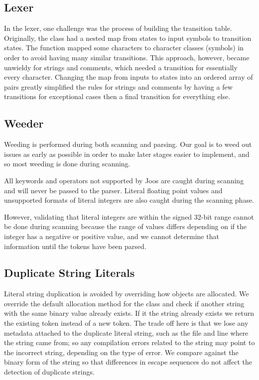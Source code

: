 \documentclass[pdftex,11pt,a4paper]{article}
\begin{document}
\subsection{Lexer}

In the lexer, one challenge was the process of building the transition
table. Originally, the  class had a nested map from states
to input symbols to transition states. The  function
mapped some characters to character classes (symbols) in order to avoid
having many similar transitions. This approach, however, became
unwieldy for strings and comments, which needed a transition for
essentially every character. Changing the map from inputs to states
into an ordered array of  pairs greatly simplified
the rules for strings and comments by having a few transitions for
exceptional cases then a final transition for everything else.


\subsection{Weeder}

Weeding is performed during both scanning and parsing. Our goal is to
weed out issues as early as possible in order to make later stages
easier to implement, and so most weeding is done during scanning.

All keywords and operators not supported by Joos are caught during
scanning and will never be passed to the parser. Literal floating
point values and unsupported formats of literal integers are also
caught during the scanning phase.

However, validating that literal integers are within the signed 32-bit
range cannot be done during scanning because the range of values
differs depending on if the integer has a negative or positive value,
and we cannot determine that information until the tokens have been
parsed.


\subsection{Duplicate String Literals}

Literal string duplication is avoided by overriding how
 objects are allocated. We override the
default allocation method for the class and check if another string
with the same binary value already exists. If it the string already
exists we return the existing token instead of a new token. The trade
off here is that we lose any metadata attached to the duplicate
literal string, such as the file and line where the string came from;
so any compilation errors related to the string may point to the
incorrect string, depending on the type of error. We compare against
the binary form of the string so that differences in escape sequences
do not affect the detection of duplicate strings.
\end{document}
